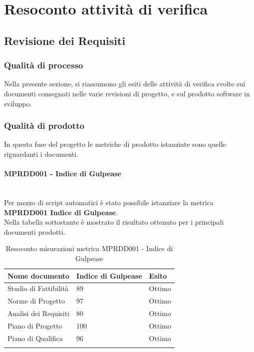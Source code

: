 \clearpage
\appendix
\section{Resoconto attività di verifica}
\label{sec:resoconto}
\subsection{Revisione dei Requisiti}
\label{sec:revisione_requisiti}
\subsubsection{Qualità di processo}
Nella presente sezione, si riassumono gli esiti delle attività di verifica svolte sui documenti consegnati nelle varie revisioni di progetto, e sul prodotto software in sviluppo.
\subsubsection{Qualità di prodotto}
In questa fase del progetto le metriche di prodotto istanziate sono quelle riguardanti i documenti.
\paragraph{MPRDD001 - Indice di Gulpease}\mbox{}\\[0.4cm]
Per mezzo di script automatici è stato possibile istanziare la metrica  \textbf{MPRDD001 Indice di Gulpease}.\\
Nella tabella sottostante è mostrato il risultato ottenuto per i principali documenti prodotti.
\begin{center}
	\centering
	\renewcommand{\arraystretch}{1.5}
	\begin{longtable}{  p{5cm}  p{5cm} p{3cm}  }
		\rowcolor{tableHeadYellow}
		\textbf{Nome documento}   & \textbf{Indice di \mbox{Gulpease}} & \textbf{Esito} \\ 
		\endhead
		Studio di Fattibilità     & 89                                 & Ottimo \\
		Norme di Progetto         & 97                                 & Ottimo \\
		Analisi dei Requisiti     & 80                                 & Ottimo \\
		Piano di Progetto         & 100                                & Ottimo \\
		Piano di Qualifica        & 96                                 & Ottimo \\
		\rowcolor{white}
		\caption{Resoconto misurazioni metrica MPRDD001 - Indice di Gulpease}
	\end{longtable}
\end{center}
